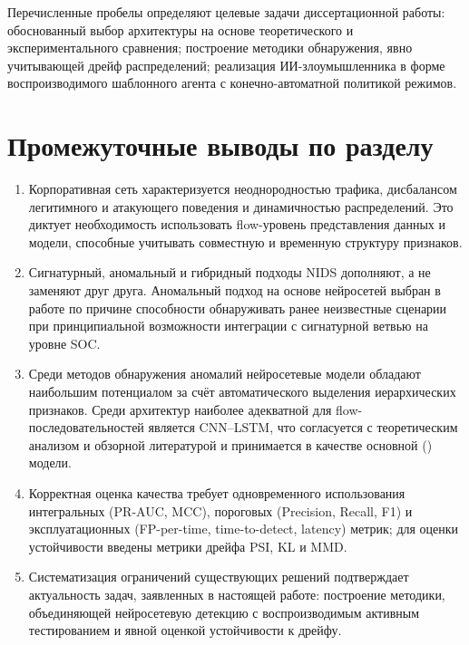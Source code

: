 Перечисленные пробелы определяют целевые задачи диссертационной работы:
обоснованный выбор архитектуры на основе теоретического и экспериментального
сравнения; построение методики обнаружения, явно учитывающей дрейф
распределений; реализация ИИ-злоумышленника в форме воспроизводимого
шаблонного агента с конечно-автоматной политикой режимов.

\section{Промежуточные выводы по разделу}

\begin{enumerate}
    \item Корпоративная сеть характеризуется неоднородностью трафика,
    дисбалансом легитимного и атакующего поведения и динамичностью
    распределений. Это диктует необходимость использовать flow-уровень
    представления данных и модели, способные учитывать совместную и временную
    структуру признаков.
    \item Сигнатурный, аномальный и гибридный подходы NIDS дополняют, а не
    заменяют друг друга. Аномальный подход на основе нейросетей выбран в
    работе по причине способности обнаруживать ранее неизвестные сценарии
    при принципиальной возможности интеграции с сигнатурной ветвью на
    уровне SOC.
    \item Среди методов обнаружения аномалий нейросетевые модели обладают
    наибольшим потенциалом за счёт автоматического выделения иерархических
    признаков. Среди архитектур наиболее адекватной для flow-последовательностей
    является CNN--LSTM, что согласуется с теоретическим анализом и обзорной
    литературой и принимается в качестве основной () модели.
    \item Корректная оценка качества требует одновременного использования
    интегральных (PR-AUC, MCC), пороговых (Precision, Recall, F1) и
    эксплуатационных (FP-per-time, time-to-detect, latency) метрик; для
    оценки устойчивости введены метрики дрейфа PSI, KL и MMD.
    \item Систематизация ограничений существующих решений подтверждает
    актуальность задач, заявленных в настоящей работе: построение методики,
    объединяющей нейросетевую детекцию с воспроизводимым активным
    тестированием и явной оценкой устойчивости к дрейфу.
\end{enumerate}
